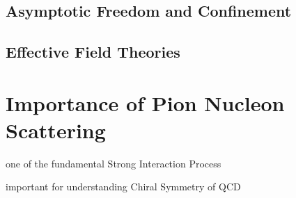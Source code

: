 \subsection{Asymptotic Freedom and Confinement}

\subsection{Effective Field Theories}




\section{Importance of Pion Nucleon Scattering}

{\orange one of the fundamental Strong Interaction Process}

{\orange important for understanding Chiral Symmetry of QCD}

